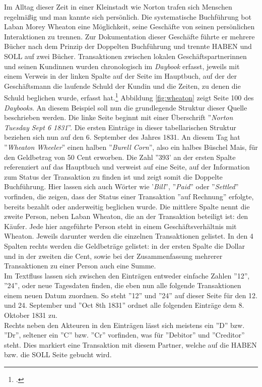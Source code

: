 \documentclass[12pt,a4paper]{article}
\begin{document}
Im Alltag dieser Zeit in einer Kleinstadt wie Norton trafen sich Menschen regelmäßig und man kannte sich persönlich. Die systematische Buchführung bot Laban Morey Wheaton eine Möglichkeit, seine Geschäfte von seinen persönlichen Interaktionen zu trennen. Zur Dokumentation dieser Geschäfte führte er mehrere Bücher nach dem Prinzip der Doppelten Buchführung und trennte HABEN und SOLL auf zwei Bücher. Transaktionen zwischen lokalen Geschäftspartnerinnen und seinen Kundinnen wurden chronologisch im \textit{Daybook} erfasst, jeweils mit einem Verweis in der linken Spalte auf der Seite im Hauptbuch, auf der der Geschäftsmann die laufende Schuld der Kundin und die Zeiten, zu denen die Schuld beglichen wurde, erfasst hat.\footcite[][S.7-9]{tomasek2013encoding} Abbildung \ref{fig:wheaton} zeigt Seite 100 des \textit{Daybooks}. An diesem Beispiel soll nun die grundlegende Struktur dieser Quelle beschrieben werden. Die linke Seite beginnt mit einer Überschrift ''\textit{Norton Tuesday Sept 6 1831}''. Die ersten Einträge in dieser tabellarischen Struktur beziehen sich nun auf den 6. September des Jahres 1831. An diesem Tag hat ''\textit{Wheaton Wheeler}'' einen halben ''\textit{Burell Corn}'', also ein halbes Büschel Mais, für den Geldbetrag von 50 Cent erworben. Die Zahl ''393' an der ersten Spalte referenziert auf das Hauptbuch und verweist auf eine Seite, auf der Information zum Status der Transaktion zu finden ist und zeigt somit die Doppelte Buchführung. Hier lassen sich auch Wörter wie '\textit{Bill}'', ''\textit{Paid}'' oder ''\textit{Settled}'' vorfinden, die zeigen, dass der Status einer Transaktion ''auf Rechnung'' erfolgte, bereits bezahlt oder anderweitig beglichen wurde. Die mittlere Spalte nennt die zweite Person, neben Laban Wheaton, die an der Transaktion beteiligt ist: den Käufer. Jede hier angeführte Person steht in einem Geschäftsverhältnis mit Wheaton. Jeweils darunter werden die einzelnen Transaktionen gelistet. In den 4 Spalten rechts werden die Geldbeträge gelistet: in der ersten Spalte die Dollar und in der zweiten die Cent, sowie bei der Zusammenfassung mehrerer Transaktionen zu einer Person auch eine Summe.
\\
Im Textfluss lassen sich zwischen den Einträgen entweder einfache Zahlen ''12'', ''24'', oder neue Tagesdaten finden, die eben nun alle folgende Transaktionen einem neuen Datum zuordnen. So steht ''12'' und ''24'' auf dieser Seite für den 12. und 24. September und ''Oct 8th 1831'' ordnet alle folgenden Einträge  dem 8. Oktober 1831 zu.
\\
Rechts neben den Akteuren in den Einträgen lässt sich meistens ein ''D'' bzw. ''Dr'', seltener ein ''C'' bzw. ''Cr'' vorfinden, was für ''Debitor'' und ''Creditor'' steht. Dies markiert eine Transaktion mit diesem Partner, welche auf die HABEN bzw. die SOLL Seite gebucht wird.
\end{document}

